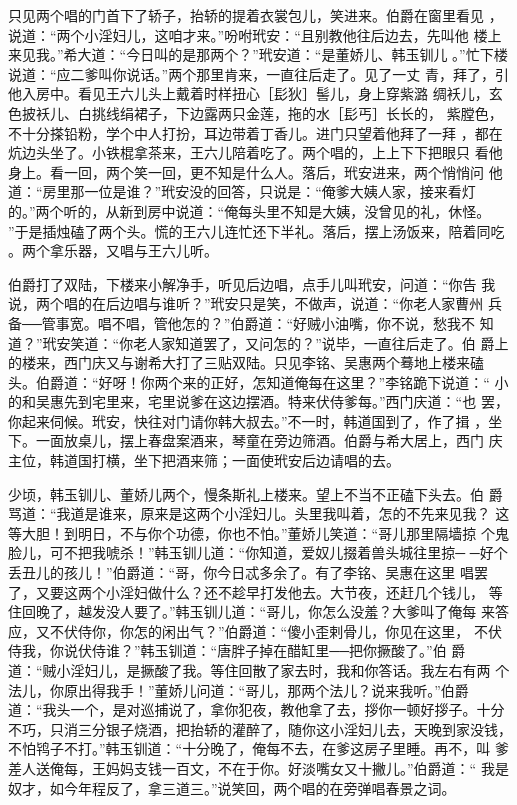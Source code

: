 只见两个唱的门首下了轿子，抬轿的提着衣裳包儿，笑进来。伯爵在窗里看见
，说道：“两个小淫妇儿，这咱才来。”吩咐玳安：“且别教他往后边去，先叫他
楼上来见我。”希大道：“今日叫的是那两个？”玳安道：“是董娇儿、韩玉钏儿
。”忙下楼说道：“应二爹叫你说话。”两个那里肯来，一直往后走了。见了一丈
青，拜了，引他入房中。看见王六儿头上戴着时样扭心［髟狄］髻儿，身上穿紫潞
绸袄儿，玄色披袄儿、白挑线绢裙子，下边露两只金莲，拖的水［髟丐］长长的，
紫膛色，不十分搽铅粉，学个中人打扮，耳边带着丁香儿。进门只望着他拜了一拜
，都在炕边头坐了。小铁棍拿茶来，王六儿陪着吃了。两个唱的，上上下下把眼只
看他身上。看一回，两个笑一回，更不知是什么人。落后，玳安进来，两个悄悄问
他道：“房里那一位是谁？”玳安没的回答，只说是：“俺爹大姨人家，接来看灯
的。”两个听的，从新到房中说道：“俺每头里不知是大姨，没曾见的礼，休怪。
”于是插烛磕了两个头。慌的王六儿连忙还下半礼。落后，摆上汤饭来，陪着同吃
。两个拿乐器，又唱与王六儿听。

伯爵打了双陆，下楼来小解净手，听见后边唱，点手儿叫玳安，问道：“你告
我说，两个唱的在后边唱与谁听？”玳安只是笑，不做声，说道：“你老人家曹州
兵备──管事宽。唱不唱，管他怎的？”伯爵道：“好贼小油嘴，你不说，愁我不
知道？”玳安笑道：“你老人家知道罢了，又问怎的？”说毕，一直往后走了。伯
爵上的楼来，西门庆又与谢希大打了三贴双陆。只见李铭、吴惠两个蓦地上楼来磕
头。伯爵道：“好呀！你两个来的正好，怎知道俺每在这里？”李铭跪下说道：“
小的和吴惠先到宅里来，宅里说爹在这边摆酒。特来伏侍爹每。”西门庆道：“也
罢，你起来伺候。玳安，快往对门请你韩大叔去。”不一时，韩道国到了，作了揖
，坐下。一面放桌儿，摆上春盘案酒来，琴童在旁边筛酒。伯爵与希大居上，西门
庆主位，韩道国打横，坐下把酒来筛；一面使玳安后边请唱的去。

少顷，韩玉钏儿、董娇儿两个，慢条斯礼上楼来。望上不当不正磕下头去。伯
爵骂道：“我道是谁来，原来是这两个小淫妇儿。头里我叫着，怎的不先来见我？
这等大胆！到明日，不与你个功德，你也不怕。”董娇儿笑道：“哥儿那里隔墙掠
个鬼脸儿，可不把我唬杀！”韩玉钏儿道：“你知道，爱奴儿掇着兽头城往里掠─
─好个丢丑儿的孩儿！”伯爵道：“哥，你今日忒多余了。有了李铭、吴惠在这里
唱罢了，又要这两个小淫妇做什么？还不趁早打发他去。大节夜，还赶几个钱儿，
等住回晚了，越发没人要了。”韩玉钏儿道：“哥儿，你怎么没羞？大爹叫了俺每
来答应，又不伏侍你，你怎的闲出气？”伯爵道：“傻小歪剌骨儿，你见在这里，
不伏侍我，你说伏侍谁？”韩玉钏道：“唐胖子掉在醋缸里──把你撅酸了。”伯
爵道：“贼小淫妇儿，是撅酸了我。等住回散了家去时，我和你答话。我左右有两
个法儿，你原出得我手！”董娇儿问道：“哥儿，那两个法儿？说来我听。”伯爵
道：“我头一个，是对巡捕说了，拿你犯夜，教他拿了去，拶你一顿好拶子。十分
不巧，只消三分银子烧酒，把抬轿的灌醉了，随你这小淫妇儿去，天晚到家没钱，
不怕鸨子不打。”韩玉钏道：“十分晚了，俺每不去，在爹这房子里睡。再不，叫
爹差人送俺每，王妈妈支钱一百文，不在于你。好淡嘴女又十撇儿。”伯爵道：“
我是奴才，如今年程反了，拿三道三。”说笑回，两个唱的在旁弹唱春景之词。

